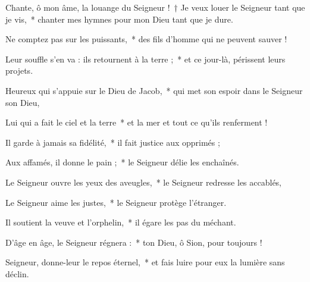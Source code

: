 \item Chante, ô mon âme, la louange du Seigneur !~† Je veux louer le Seigneur tant que je vis,~* chanter mes hymnes pour mon Dieu tant que je dure.

\item Ne comptez pas sur les puissants,~* des fils d'homme qui ne peuvent sauver !

\item Leur souffle s'en va : ils retournent à la terre ;~* et ce jour-là, périssent leurs projets.

\item Heureux qui s'appuie sur le Dieu de Jacob,~* qui met son espoir dans le Seigneur son Dieu,

\item Lui qui a fait le ciel et la terre~* et la mer et tout ce qu'ils renferment ! 

\item Il garde à jamais sa fidélité,~* il fait justice aux opprimés ; 

\item Aux affamés, il donne le pain ;~* le Seigneur délie les enchaînés.

\item Le Seigneur ouvre les yeux des aveugles,~* le Seigneur redresse les accablés, 

\item Le Seigneur aime les justes,~* le Seigneur protège l'étranger. 

\item Il soutient la veuve et l'orphelin,~* il égare les pas du méchant.

\item D'âge en âge, le Seigneur régnera :~* ton Dieu, ô Sion, pour toujours !

\item Seigneur, donne-leur le repos éternel,~* et fais luire pour eux la lumière sans déclin.